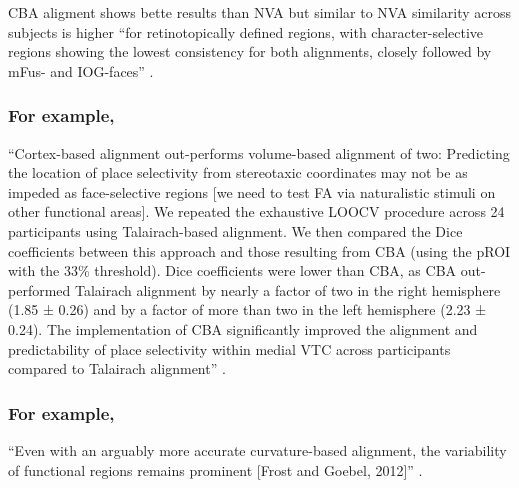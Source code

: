 
CBA aligment shows bette results than NVA but similar to NVA similarity across
subjects is higher ``for retinotopically defined regions, with
character-selective regions showing the lowest consistency for both alignments,
closely followed by mFus- and IOG-faces'' \citep{rosenke2021probabilistic}.


\subsubsection{For example, \citet{weiner2018defining}}

``Cortex-based alignment out-performs volume-based alignment of two:
%
Predicting the location of place selectivity from stereotaxic coordinates may
not be as impeded as face-selective regions [we need to test FA via naturalistic
stimuli on other functional areas].
%
We repeated the exhaustive LOOCV procedure across 24 participants using
Talairach-based alignment.
%
We then compared the Dice coefficients between this approach and those resulting
from CBA (using the pROI with the 33\% threshold).
%
Dice coefficients were lower than CBA, as CBA out-performed Talairach
alignment by nearly a factor of two in the right hemisphere (1.85 ± 0.26) and by
a factor of more than two in the left hemisphere (2.23 ± 0.24).
%
The implementation of CBA significantly improved the alignment and
predictability of place selectivity within medial VTC across participants
compared to Talairach alignment'' \citep{weiner2018defining}.


\subsubsection{For example, \citet{frost2012measuring}}

``Even with an arguably more accurate curvature-based alignment, the variability
of functional regions remains prominent [Frost and Goebel,
2012]'' \citep{zhen2015quantifying}.

